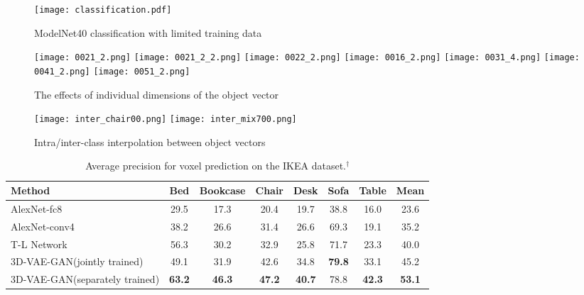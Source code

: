 \documentclass{article}
\newcommand{\vaemodel}{3D-VAE-GAN\xspace}
\begin{document}
\begin{figure}[t]
\begin{minipage}[m]{0.32\linewidth}
\texttt{[image: classification.pdf]}
\vspace{-15pt}
\caption{ModelNet40 classification with limited training data}
\label{fig:datasize}
\end{minipage}
\hfill
\begin{minipage}[m]{0.66\linewidth}
\centering
\texttt{[image: 0021\_2.png]} 
\texttt{[image: 0021\_2\_2.png]} 
\texttt{[image: 0022\_2.png]} 
\texttt{[image: 0016\_2.png]} 
\texttt{[image: 0031\_4.png]} 
\texttt{[image: 0041\_2.png]} 
\texttt{[image: 0051\_2.png]} 
\vspace{-2pt}
\caption{The effects of individual dimensions of the object vector}
\label{fig:visvect}
\vspace{7pt}
\texttt{[image: inter\_chair00.png]}
\texttt{[image: inter\_mix700.png]}
\vspace{-20pt}
\caption{Intra/inter-class interpolation between object vectors}
\label{fig:interp}
\end{minipage}
\vspace{-15pt}
\end{figure}

\begin{table}[t]
\small
\begin{center}
\begin{tabular}{lccccccc}
\toprule
Method & Bed & Bookcase & Chair & Desk & Sofa & Table & Mean \\
\midrule
AlexNet-fc8~\citep{girdhar2016learning} & 29.5 & 17.3 & 20.4 & 19.7 & 38.8 & 16.0 & 23.6 \\
AlexNet-conv4~\citep{girdhar2016learning} & 38.2 & 26.6 & 31.4 & 26.6 & 69.3 & 19.1 & 35.2 \\
T-L Network~\citep{girdhar2016learning} & 56.3 & 30.2 & 32.9 & 25.8 & 71.7 & 23.3 & 40.0 \\
\midrule
\vaemodel (jointly trained) & 49.1 & 31.9 & 42.6 & 34.8 & {\bf 79.8} & 33.1 & 45.2\\
\vaemodel (separately trained) & {\bf 63.2} & {\bf 46.3} & {\bf 47.2} &{\bf 40.7}  &  78.8 & {\bf 42.3} & {\bf 53.1}\\
\bottomrule
\end{tabular}
\end{center}
\caption{Average precision for voxel prediction on the IKEA dataset.$^\dagger$}
\label{tbl:ikea}
\vspace{-15pt}
\end{table}
\end{document}
